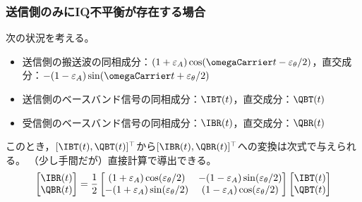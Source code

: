            \subsubsection{送信側のみにIQ不平衡が存在する場合}
                \label{送信側のみに IQ 不平衡が存在する場合}
                次の状況を考える。
                \begin{itemize}
                    \item 送信側の搬送波の同相成分：$(1+\varepsilon_A)\cos(\omegaCarrier t - \varepsilon_\theta/2)$，直交成分：$-(1-\varepsilon_A)\sin(\omegaCarrier t + \varepsilon_\theta/2)$
                    \item 送信側のベースバンド信号の同相成分：$\IBT(t)$，直交成分：$\QBT(t)$
                    \item 受信側のベースバンド信号の同相成分：$\IBR(t)$，直交成分：$\QBR(t)$
                \end{itemize}
                このとき，$[\IBT(t), \QBT(t)]^\top$から$[\IBR(t), \QBR(t)]^\top$への変換は次式で与えられる。
                （少し手間だが）直接計算で導出できる。
                \begin{equation}
                    \label{equation:送信側のみに IQ 不平衡が存在する場合のベースバンド信号の変換行列}
                    \begin{bmatrix}
                        \IBR(t) \\
                        \QBR(t)
                    \end{bmatrix} = \frac{1}{2}\begin{bmatrix}
                        (1+\varepsilon_A)\cos(\varepsilon_\theta/2) & -(1-\varepsilon_A)\sin(\varepsilon_\theta/2) \\
                        -(1+\varepsilon_A)\sin(\varepsilon_\theta/2) & (1-\varepsilon_A)\cos(\varepsilon_\theta/2)
                    \end{bmatrix}\begin{bmatrix}
                        \IBT(t) \\
                        \QBT(t)
                    \end{bmatrix}
                \end{equation}
